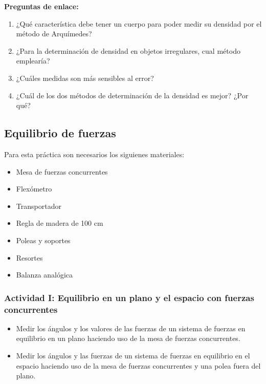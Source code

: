\documentclass[12pt]{article}
\begin{document}
\textbf{Preguntas de enlace:}
\begin{enumerate}
    \item ¿Qué característica debe tener un cuerpo para poder medir su densidad por el método de Arquímedes?
    \item ¿Para la determinación de densidad en objetos irregulares, cual método emplearía?
    \item ¿Cuáles medidas son más sensibles al error?
    \item ¿Cuál de los dos métodos de determinación de la densidad es mejor? ¿Por qué?
\end{enumerate}

\newpage

\subsection{Equilibrio de fuerzas}

Para esta práctica son necesarios los siguienes materiales:
\begin{itemize}
    \item Mesa de fuerzas concurrentes
    \item Flexómetro
    \item Transportador
    \item Regla de madera de 100 cm
    \item Poleas y soportes
    \item Resortes
    \item Balanza analógica 
\end{itemize}

\subsubsection{Actividad I: Equilibrio en un plano y el espacio con fuerzas concurrentes}

\begin{itemize}
    \item Medir los ángulos y los valores de las fuerzas de un sistema de fuerzas en equilibrio en un plano haciendo uso de la mesa de fuerzas concurrentes.
    \item Medir los ángulos y las fuerzas de un sistema de fuerzas en equilibrio en el espacio haciendo uso de la mesa de fuerzas concurrentes y una polea fuera del plano.
\end{itemize}
\end{document}
